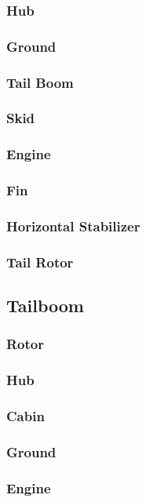 \documentclass[12pt,a4paper]{article}
\begin{document}
\subsubsection{Hub}
\subsubsection{Ground}
\subsubsection{Tail Boom}
\subsubsection{Skid}
\subsubsection{Engine}
\subsubsection{Fin}
\subsubsection{Horizontal Stabilizer}
\subsubsection{Tail Rotor}

\clearpage

\subsection{Tailboom}
\subsubsection{Rotor}
\subsubsection{Hub}
\subsubsection{Cabin}
\subsubsection{Ground}
\subsubsection{Engine}
\end{document}
